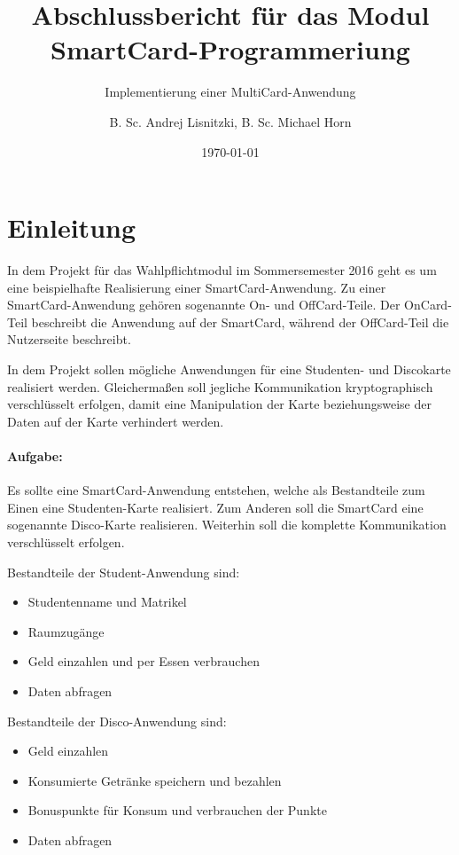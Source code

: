 					
\title{Abschlussbericht für das Modul SmartCard-Programmeriung}
\subtitle{Implementierung einer MultiCard-Anwendung\vspace{1cm}}

\author{B. Sc. Andrej Lisnitzki, B. Sc. Michael Horn}
\date{\today}

\maketitle

\tableofcontents
\pagebreak

\section{Einleitung}
In dem Projekt  für das Wahlpflichtmodul  im Sommersemester 2016 geht es um eine beispielhafte Realisierung einer SmartCard-Anwendung.
Zu einer SmartCard-Anwendung gehören sogenannte On- und OffCard-Teile.
Der OnCard-Teil beschreibt die Anwendung auf der SmartCard, während der OffCard-Teil die Nutzerseite beschreibt.

In dem Projekt  sollen mögliche Anwendungen für eine Studenten- und Discokarte realisiert werden.
Gleichermaßen soll jegliche Kommunikation kryptographisch verschlüsselt erfolgen, damit eine Manipulation der Karte beziehungsweise der Daten auf der Karte verhindert werden.

\paragraph{Aufgabe:}
Es sollte eine SmartCard-Anwendung entstehen, welche als Bestandteile zum Einen eine Studenten-Karte realisiert.
Zum Anderen soll die SmartCard eine sogenannte Disco-Karte realisieren.
Weiterhin soll die komplette Kommunikation verschlüsselt erfolgen.

Bestandteile der Student-Anwendung sind:
\begin{itemize}
	\item Studentenname und Matrikel
	\item Raumzugänge
	\item Geld einzahlen und per Essen verbrauchen
	\item Daten abfragen
\end{itemize}

Bestandteile der Disco-Anwendung sind:
\begin{itemize}
	\item Geld einzahlen
	\item Konsumierte Getränke speichern und bezahlen
	\item Bonuspunkte für Konsum und verbrauchen der Punkte
	\item Daten abfragen
\end{itemize}

